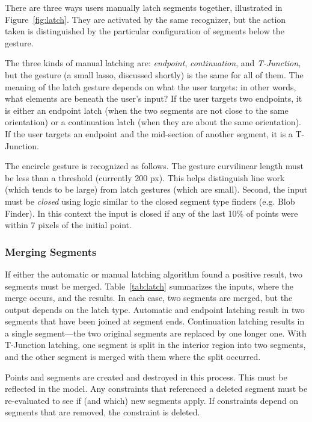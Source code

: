 There are three ways users manually latch segments together,
illustrated in Figure~\ref{fig:latch}. They are activated by the same
recognizer, but the action taken is distinguished by the particular
configuration of segments below the gesture.

The three kinds of manual latching are: \textit{endpoint},
\textit{continuation}, and \textit{T-Junction}, but the gesture (a
small lasso, discussed shortly) is the same for all of them. The
meaning of the latch gesture depends on what the user targets: in
other words, what elements are beneath the user's input? If the user
targets two endpoints, it is either an endpoint latch (when the two
segments are not close to the same orientation) or a continuation
latch (when they are about the same orientation). If the user targets
an endpoint and the mid-section of another segment, it is a
T-Junction.

The encircle gesture is recognized as follows. The gesture curvilinear
length must be less than a threshold (currently 200 px). This helps
distinguish line work (which tends to be large) from latch gestures
(which are small). Second, the input must be \textit{closed} using
logic similar to the closed segment type finders (e.g. Blob
Finder). In this context the input is closed if any of the last 10\%
of points were within 7 pixels of the initial point.

\subsubsection{Merging Segments}



If either the automatic or manual latching algorithm found a positive
result, two segments must be merged. Table~\ref{tab:latch} summarizes
the inputs, where the merge occurs, and the results. In each case, two
segments are merged, but the output depends on the latch
type. Automatic and endpoint latching result in two segments that have
been joined at segment ends. Continuation latching results in a single
segment---the two original segments are replaced by one longer
one. With T-Junction latching, one segment is split in the interior
region into two segments, and the other segment is merged with them
where the split occurred.

Points and segments are created and destroyed in this process. This
must be reflected in the model. Any constraints that referenced a
deleted segment must be re-evaluated to see if (and which) new
segments apply. If constraints depend on segments that are removed,
the constraint is deleted.


